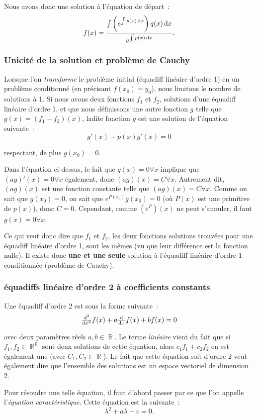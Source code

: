 \documentclass{article}
\DeclareMathOperator{\R}{\mathbb R}
\theoremstyle{definition}
\theoremstyle{remark}
\begin{document}
			Nous avons donc une solution à l'équation de départ~:
			\[f(x) = \frac {\int \left(e^{\int p(x)\dif x}\right)q(x)\dif x}{e^{\int p(x)\dif x}}.\]

		\subsubsection{Unicité de la solution et problème de Cauchy}
			Lorsque l'on \textit{transforme} le problème initial (équadiff linéaire d'ordre 1) en un problème conditionné (en précisant
			$f(x_0) = y_0$), nous limitons le nombre de solutions à 1. Si nous avons deux fonctions $f_1$ et $f_2$, solutions d'une équadiff linéaire
			d'ordre 1, et que nous définissons une autre fonction $g$ telle que $g(x) = (f_1 - f_2)(x)$, ladite fonction $g$ est une solution de
			l'équation suivante~:
			\[g'(x) + p(x)g'(x) = 0\]

			respectant, de plus $g(x_0) = 0$.

			Dans l'équation ci-dessus, le fait que $q(x) = 0 \forall x$ implique que $(ag)'(x) = 0 \forall x$ également, donc $(ag)(x) = C \forall x$.
			Autrement dit, $(ag)(x)$ est une fonction constante telle que $(ag)(x) = C \forall x$. Comme on sait que $g(x_0) = 0$, on sait que
			$e^{P(x_0)}g(x_0) = 0$ (où $P(x)$ est une primitive de $p(x)$), donc $C = 0$. Cependant, comme $(e^P)(x)$ ne peut s'annuler, il faut $g(x) = 0 \forall x$.

			Ce qui veut donc dire que $f_1$ et $f_2$, les deux fonctions solutions trouvées pour une équadiff linéaire d'ordre 1, sont les mêmes (vu que leur différence
			est la fonction nulle). Il existe donc \textbf{une et une seule} solution à l'équadiff linéaire d'ordre 1 conditionnée (problème de Cauchy).

		\subsubsection{équadiffs linéaire d'ordre 2 à coefficients constants}
			Une équadiff d'ordre 2 est sous la forme suivante~:
			\[\od[2]{}{x}f(x) + a\od{}{x}f(x) + bf(x) = 0\]

			avec deux paramètres réels $a, b \in \R$. Le terme \textit{linéaire} vient du fait que si $f_1, f_2 \in \R^{\R}$ sont deux solutions de
			cette équation, alors $c_1f_1 + c_2f_2$ en est également une (avec $C_1, C_2 \in \R$). Le fait que cette équation soit d'ordre 2 veut également
			dire que l'ensemble des solutions est un espace vectoriel de dimension 2.

			Pour résoudre une telle équation, il faut d'abord passer par ce que l'on appelle l'\textit{équation caractéristique}. Cette équation est la suivante~:
			\[\lambda^2 + a\lambda + c = 0.\]
\end{document}
